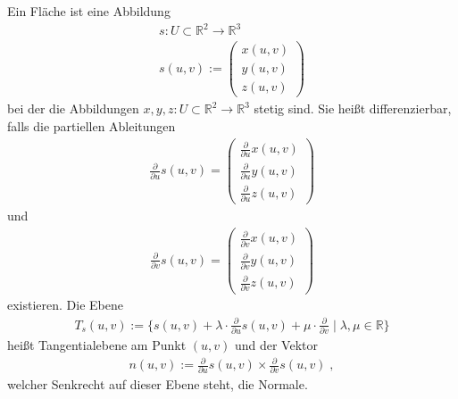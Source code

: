 \begin{Definition}
Ein Fläche ist   eine Abbildung
\begin{align*}
s: U \subset \mathbb{R}^2 \to \mathbb{R}^3 \\
s(u,v) := \begin{pmatrix} x(u,v) \\ y(u,v) \\ z(u,v) \end{pmatrix} 
\end{align*} 
bei der die Abbildungen $x, y, z : U \subset \mathbb{R}^2 \to \mathbb{R}^3$ stetig sind. Sie heißt differenzierbar, falls die partiellen Ableitungen
\begin{align*}
\frac{\partial}{\partial u} s(u,v) = \begin{pmatrix}  \frac{\partial}{\partial u} x(u,v) \\  \frac{\partial}{\partial u} y(u,v) \\  \frac{\partial}{\partial u} z(u,v) \end{pmatrix}
\end{align*}
und 
\begin{align*}
\frac{\partial}{\partial v} s(u,v) =  \begin{pmatrix} \frac{\partial}{\partial v} x(u,v) \\ \frac{\partial}{\partial v} y(u,v) \\ \frac{\partial}{\partial v} z(u,v) \end{pmatrix}
\end{align*}
existieren. Die Ebene 
\begin{align*}
T_s(u,v) :=  \{ s(u,v) + \lambda \cdot \frac{\partial}{\partial u} s(u,v) + \mu \cdot \frac{\partial}{\partial v} \; | \; \lambda, \mu \in \mathbb{R} \}
\end{align*}
heißt Tangentialebene am Punkt $(u,v)$ und  der Vektor 
\begin{align*}
n (u,v):= \frac{\partial}{\partial u} s(u,v) \times \frac{\partial}{\partial v} s(u,v) \; ,
\end{align*}
welcher Senkrecht auf dieser Ebene steht,  die Normale.
\end{Definition}



